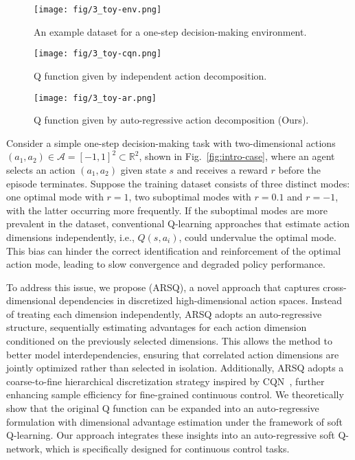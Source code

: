 \begin{figure*}[ht]
    \centering
    \begin{subfigure}[t]{0.30\textwidth}
        \centering
        \texttt{[image: fig/3\_toy-env.png]}
        \caption{An example dataset for a one-step decision-making environment.}
        \label{fig:intro-toy-env}
    \end{subfigure}
    \hspace{0.01\textwidth}
    \begin{subfigure}[t]{0.30\textwidth}
        \centering
        \texttt{[image: fig/3\_toy-cqn.png]}
        \caption{Q function given by independent action decomposition.}
        \label{fig:intro-toy-cqn}
    \end{subfigure}
    \hspace{0.01\textwidth}
    \begin{subfigure}[t]{0.30\textwidth}
        \centering
        \texttt{[image: fig/3\_toy-ar.png]}
        \caption{Q function given by auto-regressive action decomposition (Ours).}
        \label{fig:intro-toy-ar}
    \end{subfigure}
    \caption{A motivating example of how Q decomposition influences policy training, as detailed in Appendix~\ref{sec:app-example}.}
    \label{fig:intro-case}
\end{figure*}

Consider a simple one-step decision-making task with two-dimensional actions $(a_1,a_2) \in \mathcal{A} = [-1, 1]^2 \subset \mathbb{R}^2$, shown in Fig.~\ref{fig:intro-case}, where an agent selects an action $(a_1,a_2)$ given state $s$ and receives a reward $r$ before the episode terminates. Suppose the training dataset consists of three distinct modes: one optimal mode with $r=1$, two suboptimal modes with $r=0.1$ and $r=-1$, with the latter occurring more frequently. If the suboptimal modes are more prevalent in the dataset, conventional Q-learning approaches that estimate action dimensions independently, i.e., $Q(s,a_i)$, could undervalue the optimal mode. This bias can hinder the correct identification and reinforcement of the optimal action mode, leading to slow convergence and degraded policy performance.

To address this issue, we propose \arsq (ARSQ), a novel approach that captures cross-dimensional dependencies in discretized high-dimensional action spaces. 
Instead of treating each dimension independently, ARSQ adopts an auto-regressive structure, sequentially estimating advantages for each action dimension conditioned on the previously selected dimensions. This allows the method to better model interdependencies, ensuring that correlated action dimensions are jointly optimized rather than selected in isolation. Additionally, ARSQ adopts a coarse-to-fine hierarchical discretization strategy inspired by CQN~\cite{CQN}, further enhancing sample efficiency for fine-grained continuous control.
We theoretically show that the original Q function can be expanded into an auto-regressive formulation with dimensional advantage estimation under the framework of soft Q-learning. Our approach integrates these insights into an auto-regressive soft Q-network, which is specifically designed for continuous control tasks. 


